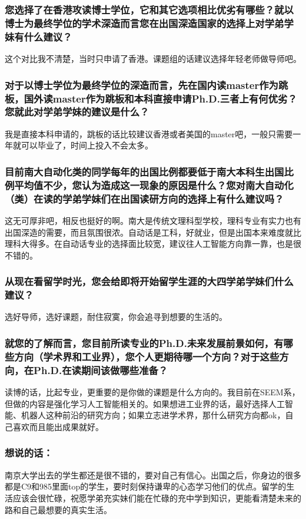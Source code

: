 \documentclass[a4paper,UTF8]{book}
\begin{document}
    \subsubsection*{您选择了在香港攻读博士学位，它和其它选项相比优劣有哪些？就以博士为最终学位的学术深造而言您在出国深造国家的选择上对学弟学妹有什么建议？}
    这个对比我不清楚，当时只申请了香港。课题组的话建议选择年轻老师做导师吧。

    \subsubsection*{对于以博士学位为最终学位的深造而言，先在国内读master作为跳板，国外读master作为跳板和本科直接申请Ph.D.三者上有何优劣？您就此对学弟学妹的建议是什么？}
    我是直接本科申请的，跳板的话比较建议香港或者美国的master吧，一般只需要一年就可以毕业了，时间上投入不会太多。

    \subsubsection*{目前南大自动化类的同学每年的出国比例都要低于南大本科生出国比例平均值不少，您认为造成这一现象的原因是什么？您对南大自动化（类）在读的学弟学妹们在出国读研方向的选择上有什么建议吗？}
    这无可厚非吧，相反也挺好的啊。南大是传统文理科型学校，理科专业有实力也有出国深造的需要，而且氛围很浓。自动话是工科，好就业，但是出国本来难度就比理科大得多。在自动话专业的选择面比较宽，建议往人工智能方向靠一靠，也是很不错的。
    
    \subsubsection*{从现在看留学时光，您会给即将开始留学生涯的大四学弟学妹们什么建议？}
    选好导师，选好课题，耐住寂寞，你会追寻到想要的生活的。

    \subsubsection*{就您的了解而言，您目前所读专业的Ph.D.未来发展前景如何，有哪些方向（学术界和工业界），您个人更期待哪一个方向？对于这些方向，在Ph.D.在读期间该做哪些准备？}
    读博的话，比起专业，更重要的是你做的课题是什么方向的。我目前在SEEM系，但做的内容是强化学习人工智能相关的。如果想进工业界的话，最好选择人工智能、机器人这种前沿的研究方向；如果立志进学术界，那什么研究方向都ok，自己喜欢而且能出成果就好。
                    
    \subsubsection{想说的话：}
    南京大学出去的学生都还是很不错的，要对自己有信心。出国之后，你身边的很多都是C9和985里面top的学生，要时刻保持谦卑的心态学习他们的优点。留学的生活应该会很忙碌，祝愿学弟充实妹们能在忙碌的充中学到知识，更能看清楚未来的路和自己最想要的真实生活。
        
\end{document}
